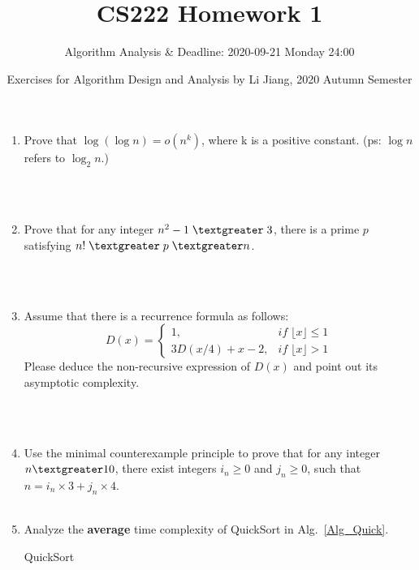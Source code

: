 \documentclass{article}
\title{CS222 Homework 1}
\author{Algorithm Analysis \& Deadline: 2020-09-21 Monday 24:00}
\date{Exercises for Algorithm Design and Analysis by Li Jiang, 2020 Autumn Semester}
\begin{document}
\maketitle

\begin{enumerate}

\item Prove that $\log (\log n) = o(n^k)$, where k is a positive constant. (ps: $\log n$ refers to $\log_2 n$.)

~\\
~\\

\item Prove that for any integer $n^2 -1\;\textgreater\;3$, there is a prime $p$ satisfying $n!\;\textgreater\;p\;\textgreater n$.

~\\
~\\
\item Assume that there is a recurrence formula as follows: 
\begin{equation*}
	D(x) = \begin{cases}
	1, &if\;\lfloor x \rfloor \leq 1\\
	3D(x/4) + x - 2, &if\;\lfloor x \rfloor  > 1
	\end{cases}
\end{equation*}
Please deduce the non-recursive expression of $D(x)$ and point out its asymptotic complexity. 

~\\
~\\


\item Use the minimal counterexample principle to prove that for any integer $n \textgreater 10$, there exist integers $i_n\geq0$ and $j_n\geq 0$, such that $n = i_n \times 3 + j_n \times 4$.
~\\
~\\

\item  Analyze the \textbf{average} time complexity of QuickSort in Alg.~\ref{Alg_Quick}.

    \begin{minipage}[t]{0.8\textwidth}
    \begin{algorithm}[H]

      \BlankLine
      \caption{QuickSort}\label{Alg_Quick}



\end{algorithm}
\end{minipage}
\end{enumerate}
\end{document}
